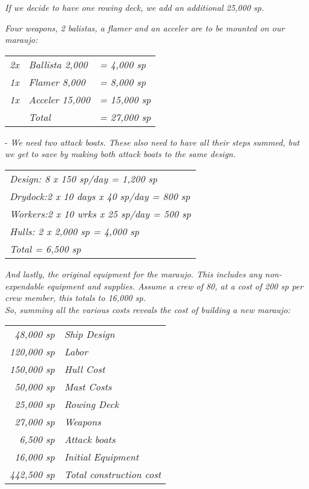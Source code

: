 \begin{multicols*}{2}
\textit{If we decide to have one rowing deck, we add an additional 25,000 sp.}

\textit{Four weapons, 2 balistas, a flamer and an acceler are to be mounted on our maraujo:}

\begin{tabular}{@{}l l l}
\textit{2x} & \textit{Ballista 2,000} & \textit{=  4,000 sp}\\
\textit{1x} & \textit{Flamer 8,000} & \textit{=  8,000 sp}\\
\textit{1x} & \textit{Acceler 15,000} & \textit{=  15,000 sp}\\
 & \textit{Total} & \textit{=  27,000 sp}\\
\end{tabular}

- \textit{We need two attack boats. These also need to have all their steps summed, but we get to save by making both attack boats to the same design.}

\begin{tabular}{@{}l}
\textit{Design: 8 x 150 sp/day = 1,200 sp}\\
\textit{Drydock:2 x 10 days x 40 sp/day = 800 sp}\\
\textit{Workers:2 x 10 wrks x 25 sp/day = 500 sp}\\
\textit{Hulls: 2 x 2,000 sp = 4,000 sp}\\
\textit{Total = 6,500 sp}\\
\end{tabular}

\textit{And lastly, the original equipment for the maraujo. This includes any non-expendable equipment and supplies. Assume a crew of 80, at a cost of 200 sp per crew member,
this totals to 16,000 sp.}\\
\textit{So, summing all the various costs reveals the cost of building a new maraujo:}

\begin{tabular}{@{}r l}
\textit{48,000 sp} & \textit{Ship Design}\\
\textit{120,000 sp} & \textit{Labor}\\
\textit{150,000 sp} & \textit{Hull Cost}\\
\textit{50,000 sp} & \textit{Mast Costs}\\
\textit{25,000 sp} & \textit{Rowing Deck}\\
\textit{27,000 sp} & \textit{Weapons}\\
\textit{6,500 sp} & \textit{Attack boats}\\
\textit{16,000 sp} & \textit{Initial Equipment}\\
\textit{442,500 sp} & \textit{Total construction cost}\\
\end{tabular}


\end{multicols*}
